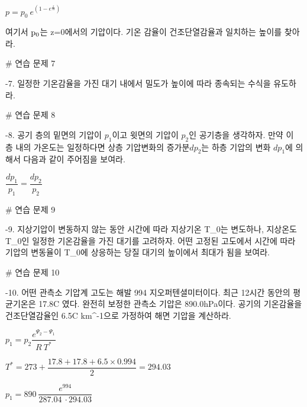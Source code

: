 $ p = p_{0}~ e^{(1-e^{\frac{z}{H}})}$

여기서 $\rm p_{0}$는 z=0에서의 기압이다. 기온 감율이 건조단열감율과 일치하는 높이를 찾아라.



# 연습 문제 7

-7. 일정한 기온감율을 가진 대기 내에서 밀도가 높이에 따라 종속되는 수식을 유도하라.




# 연습 문제 8


-8. 공기 층의 밑면의 기압이 $p_1$이고 윗면의 기압이 $p_2$인 공기층을 생각하자. 만약 이 층 내의 가온도는 일정하다면 상층 기압변화의 증가분$dp_2$는 하층 기압의 변화 $dp_1$에 의해서 다음과 같이 주어짐을 보여라.

$ \dfrac{dp_1}{p_1} =  \dfrac{dp_2}{p_2}$




# 연습 문제 9


-9. 지상기압이 변동하지 않는 동안 시간에 따라 지상기온 T_0는 변도하나, 지상온도 T_0인 일정한 기온감율을 가진 대기를 고려하자. 어떤 고정된 고도에서 시간에 따라 기압의 변동율이 T_0에 상응하는 당질 대기의 높이에서 최대가 됨을 보여라.



# 연습 문제 10


-10. 어떤 관측소 기압계 고도는 해발 994 지오퍼텐셜미터이다. 최근 12시간 동안의 평균기온은 17.8C 였다. 완전히 보정한 관측소 기압은 890.0hPa이다. 공기의 기온감율을 건조단열감율인 6.5C km^{-1}으로 가정하여 해면 기압을 계산하라.

$p_{1} = p_{2} \dfrac{e^{\Psi_2 - \Psi_1}}{R~T^{*}}$

$ T^{*} = 273 + \dfrac{17.8 + 17.8 + 6.5 \times 0.994}{2} = 294.03$

$p_{1} = 890 ~\dfrac{e^{994}}{287.04~\cdot 294.03}$